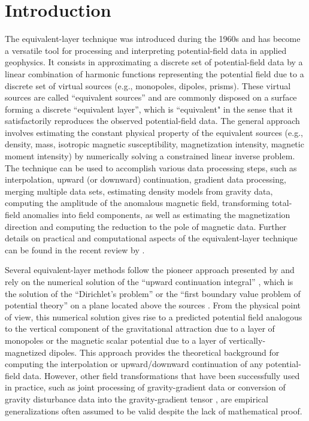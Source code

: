 \section{Introduction}

The equivalent-layer technique was introduced during the 1960s and has become a versatile
tool for processing and interpreting potential-field data in applied geophysics. 
It consists in approximating a discrete set of potential-field data 
by a linear combination of harmonic functions representing the potential field 
due to a discrete set of virtual sources (e.g., monopoles, dipoles, prisms).
These virtual sources are called ``equivalent sources'' and are commonly disposed on a 
surface forming a discrete ``equivalent layer'', which is ``equivalent" 
in the sense that it satisfactorily reproduces the observed potential-field data.
The general approach involves estimating the constant physical property of the equivalent 
sources (e.g., density, mass, isotropic magnetic susceptibility, magnetization intensity, 
magnetic moment intensity) by numerically solving a constrained linear inverse problem.
The technique can be used to accomplish various data processing steps, such as interpolation, 
upward (or downward) continuation, gradient data processing, merging multiple data sets, 
estimating density models from gravity data, 
computing the amplitude of the anomalous magnetic field, 
transforming total-field anomalies into field components, 
as well as estimating the magnetization direction and computing the reduction to the pole
of magnetic data. 
Further details on practical and computational aspects of the equivalent-layer technique 
can be found in the recent review by \cite{oliveirajr_etal2023}.

Several equivalent-layer methods follow the pioneer approach presented
by \cite{dampney1969} and rely on the numerical solution of the 
``upward continuation integral'' \citep[e.g.,][]{skeels1947, peters1949, henderson-zietz1949,
dean1958, roy1962, bhattacharyya1967, henderson1970}, which is the solution of the
``Dirichlet’s problem'' or the ``first boundary value problem of potential
theory'' on a plane located above the sources \cite[][ p. 236]{kellogg1967}. 
From the physical point of view, this numerical solution gives rise to a predicted potential field 
analogous to the vertical component of the gravitational attraction due to a layer of monopoles
or the magnetic scalar potential due to a layer of vertically-magnetized dipoles.
This approach provides the theoretical background for computing the interpolation or 
upward/downward continuation of any potential-field data.
However, other field transformations that have been successfully used in practice, 
such as joint processing of gravity-gradient data 
\citep[e.g.,][]{barnes_lumley2011} or conversion of gravity disturbance data into the 
gravity-gradient tensor \citep[e.g.,][]{piauilino_etal2019_seg, oliveirajr_etal2023}, are 
empirical generalizations often assumed to be valid despite the lack of mathematical proof.

